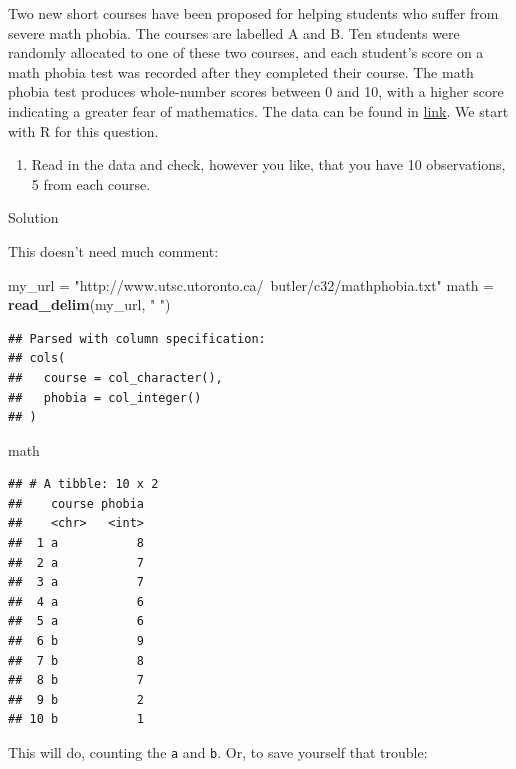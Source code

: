 \documentclass[]{tufte-book}
\newenvironment{Shaded}{}{}
\newcommand{\KeywordTok}[1]{\textcolor[rgb]{0.00,0.44,0.13}{\textbf{#1}}}
\newcommand{\NormalTok}[1]{#1}
\newcommand{\StringTok}[1]{\textcolor[rgb]{0.25,0.44,0.63}{#1}}
\providecommand{\tightlist}{%
  \setlength{\itemsep}{0pt}\setlength{\parskip}{0pt}}
\theoremstyle{definition}
\theoremstyle{definition}
\theoremstyle{definition}
\theoremstyle{remark}
\begin{document}
Two new short courses have been proposed for helping students who suffer
from severe math phobia. The courses are labelled A and B. Ten students
were randomly allocated to one of these two courses, and each student's
score on a math phobia test was recorded after they completed their
course. The math phobia test produces whole-number scores between 0 and
10, with a higher score indicating a greater fear of mathematics. The
data can be found in
\href{http://www.utsc.utoronto.ca/~butler/c32/mathphobia.txt}{link}. We
start with R for this question.

\begin{enumerate}
\def\labelenumi{(\alph{enumi})}
\tightlist
\item
  Read in the data and check, however you like, that you have 10
  observations, 5 from each course.
\end{enumerate}

Solution

This doesn't need much comment:

\begin{Shaded}
\begin{Highlighting}[]
\NormalTok{my_url =}\StringTok{ "http://www.utsc.utoronto.ca/~butler/c32/mathphobia.txt"}
\NormalTok{math =}\StringTok{ }\KeywordTok{read_delim}\NormalTok{(my_url, }\StringTok{" "}\NormalTok{)}
\end{Highlighting}
\end{Shaded}

\begin{verbatim}
## Parsed with column specification:
## cols(
##   course = col_character(),
##   phobia = col_integer()
## )
\end{verbatim}

\begin{Shaded}
\begin{Highlighting}[]
\NormalTok{math}
\end{Highlighting}
\end{Shaded}

\begin{verbatim}
## # A tibble: 10 x 2
##    course phobia
##    <chr>   <int>
##  1 a           8
##  2 a           7
##  3 a           7
##  4 a           6
##  5 a           6
##  6 b           9
##  7 b           8
##  8 b           7
##  9 b           2
## 10 b           1
\end{verbatim}

This will do, counting the \texttt{a} and \texttt{b}. Or, to save
yourself that trouble:
\end{document}
